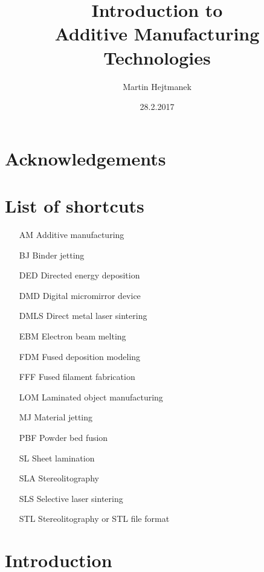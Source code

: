 \documentclass[a4paper, twoside, 11pt]{report}
\begin{document}
%
\begin{titlepage}
\title{Introduction to\\Additive Manufacturing Technologies}
\author{Martin Hejtmanek}
\date{28.2.2017}
\maketitle
\end{titlepage}
%
\chapter*{Acknowledgements}


\chapter*{List of shortcuts}
\begin{itemize}
\item[AM]Additive manufacturing
\item[BJ]Binder jetting
\item[DED]Directed energy deposition
\item[DMD]Digital micromirror device
\item[DMLS]Direct metal laser sintering
\item[EBM]Electron beam melting
\item[FDM]Fused deposition modeling
\item[FFF]Fused filament fabrication
\item[LOM]Laminated object manufacturing
\item[MJ]Material jetting
\item[PBF]Powder bed fusion
\item[SL]Sheet lamination
\item[SLA]Stereolitography
\item[SLS]Selective laser sintering
\item[STL]Stereolitography or STL file format
\end{itemize}


\chapter{Introduction}
%
%
%
\end{document}
